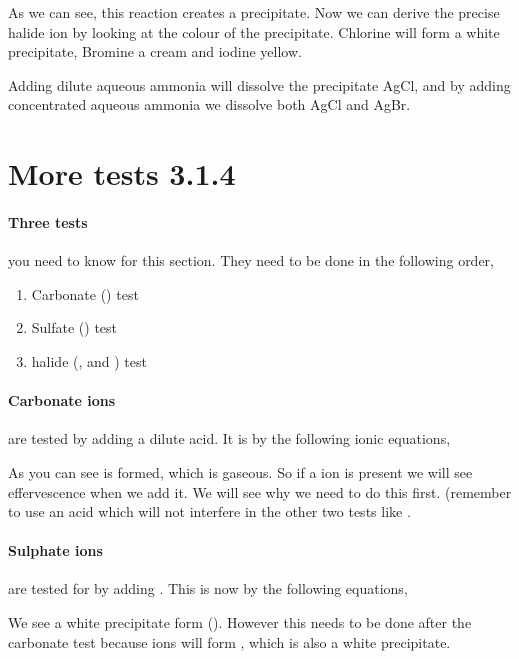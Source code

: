 \documentclass[11pt,a4paper]{memoir}
\begin{document}
	As we can see, this reaction creates a precipitate. Now we can derive the precise halide ion by looking at the colour of the precipitate. Chlorine will form a white precipitate, Bromine a cream and iodine yellow.
	
	Adding dilute aqueous ammonia will dissolve the precipitate AgCl, and by adding concentrated aqueous ammonia we dissolve both AgCl and AgBr.
	
\section{More tests 3.1.4}

	\paragraph{Three tests} you need to know for this section. They need to be done in the following order,
	\begin{enumerate}
		\item Carbonate () test
		\item Sulfate () test
		\item halide (, and ) test
	\end{enumerate}
	
	\paragraph{Carbonate ions} are tested by adding a dilute acid. It is by the following ionic equations,
	\begin{center}
	\end{center}
	As you can see  is formed, which is gaseous. So if a  ion is present we will see effervescence when we add it. We will see why we need to do this first. (remember to use an acid which will not interfere in the other two tests like .
	
	\paragraph{Sulphate ions} are tested for by adding . This is now by the following equations,
	\begin{center}
	\end{center}
	We see a white precipitate form (). However this needs to be done after the carbonate test because  ions will form , which is also a white precipitate.
	
\end{document}
